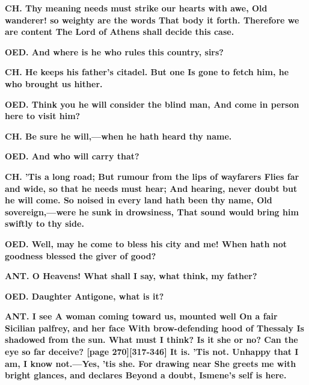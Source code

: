 \documentclass[11pt,letter]{book}
\begin{document}
\par \textbf{CH. Thy meaning needs must strike our hearts with awe, Old wanderer! so weighty are the words That body it forth. Therefore we are content The Lord of Athens shall decide this case.}
\par 

\par \textbf{OED. And where is he who rules this country, sirs?}
\par 

\par \textbf{CH. He keeps his father’s citadel. But one Is gone to fetch him, he who brought us hither.}
\par 

\par \textbf{OED. Think you he will consider the blind man, And come in person here to visit him?}
\par 

\par \textbf{CH. Be sure he will,—when he hath heard thy name.}
\par 

\par \textbf{OED. And who will carry that?}
\par 

\par \textbf{CH. ’Tis a long road; But rumour from the lips of wayfarers Flies far and wide, so that he needs must hear; And hearing, never doubt but he will come. So noised in every land hath been thy name, Old sovereign,—were he sunk in drowsiness, That sound would bring him swiftly to thy side.}
\par 

\par \textbf{OED. Well, may he come to bless his city and me! When hath not goodness blessed the giver of good?}
\par 

\par \textbf{ANT. O Heavens! What shall I say, what think, my father?}
\par 

\par \textbf{OED. Daughter Antigone, what is it?}
\par 

\par \textbf{ANT. I see A woman coming toward us, mounted well On a fair Sicilian palfrey, and her face With brow-defending hood of Thessaly Is shadowed from the sun. What must I think? Is it she or no? Can the eye so far deceive? [page 270][317-346] It is. ’Tis not. Unhappy that I am, I know not.—Yes, ’tis she. For drawing near She greets me with bright glances, and declares Beyond a doubt, Ismene’s self is here.}
\par 
\end{document}
